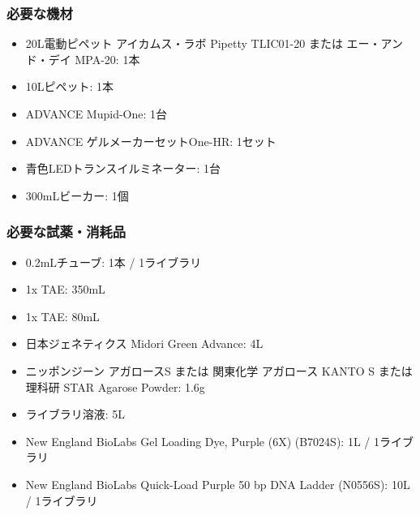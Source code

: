 \documentclass[titlepage,10pt,a4paper,uplatex]{jsbook}
\begin{document}
\subsubsection{必要な機材}
\begin{itemize}
\item 20{\textmu}L電動ピペット アイカムス・ラボ Pipetty TLIC01-20 または エー・アンド・デイ MPA-20: 1本
\item 10{\textmu}Lピペット: 1本
\item ADVANCE Mupid-One: 1台
\item ADVANCE ゲルメーカーセットOne-HR: 1セット
\item 青色LEDトランスイルミネーター: 1台
\item 300mLビーカー: 1個
\end{itemize}

\subsubsection{必要な試薬・消耗品}
\begin{itemize}
\item 0.2mLチューブ: 1本 / 1ライブラリ
\item 1x TAE: 350mL
\item 1x TAE: 80mL
\item 日本ジェネティクス Midori Green Advance: 4{\textmu}L
\item ニッポンジーン アガロースS または 関東化学 アガロース KANTO S または 理科研 STAR Agarose Powder: 1.6g
\item ライブラリ溶液: 5{\textmu}L
\item New England BioLabs Gel Loading Dye, Purple (6X) (B7024S): 1{\textmu}L / 1ライブラリ
\item New England BioLabs Quick-Load Purple 50 bp DNA Ladder (N0556S): 10{\textmu}L / 1ライブラリ
\end{itemize}
\end{document}
